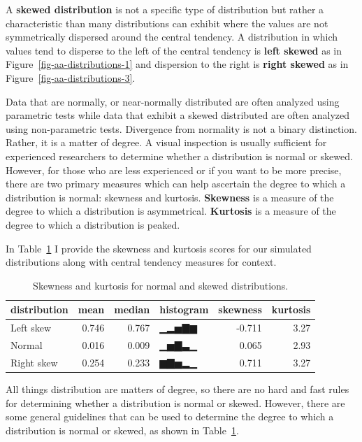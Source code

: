 \documentclass[
  letterpaper,
  DIV=11,
  numbers=noendperiod]{scrreport}
\theoremstyle{definition}
\theoremstyle{remark}
\begin{document}
A \textbf{skewed distribution} is not a specific type of distribution
but rather a characteristic than many distributions can exhibit where
the values are not symmetrically dispersed around the central tendency.
A distribution in which values tend to disperse to the left of the
central tendency is \textbf{left skewed} as in
Figure~\ref{fig-aa-distributions-1} and dispersion to the right is
\textbf{right skewed} as in Figure~\ref{fig-aa-distributions-3}.

Data that are normally, or near-normally distributed are often analyzed
using parametric tests while data that exhibit a skewed distributed are
often analyzed using non-parametric tests. Divergence from normality is
not a binary distinction. Rather, it is a matter of degree. A visual
inspection is usually sufficient for experienced researchers to
determine whether a distribution is normal or skewed. However, for those
who are less experienced or if you want to be more precise, there are
two primary measures which can help ascertain the degree to which a
distribution is normal: skewness and kurtosis. \textbf{Skewness} is a
measure of the degree to which a distribution is asymmetrical.
\textbf{Kurtosis} is a measure of the degree to which a distribution is
peaked.

In Table~\ref{tbl-aa-skewness-kurtosis} I provide the skewness and
kurtosis scores for our simulated distributions along with central
tendency measures for context.

\hypertarget{tbl-aa-skewness-kurtosis}{}
\begin{table}
\caption{\label{tbl-aa-skewness-kurtosis}Skewness and kurtosis for normal and skewed distributions. }\tabularnewline

\centering
\begin{tabular}{l|r|r|l|r|r}
\hline
distribution & mean & median & histogram & skewness & kurtosis\\
\hline
Left skew & 0.746 & 0.767 & ▁▂▅▇▆ & -0.711 & 3.27\\
\hline
Normal & 0.016 & 0.009 & ▁▅▇▃▁ & 0.065 & 2.93\\
\hline
Right skew & 0.254 & 0.233 & ▆▇▅▂▁ & 0.711 & 3.27\\
\hline
\end{tabular}
\end{table}

All things distribution are matters of degree, so there are no hard and
fast rules for determining whether a distribution is normal or skewed.
However, there are some general guidelines that can be used to determine
the degree to which a distribution is normal or skewed, as shown in
Table~\ref{tbl-aa-skewness-kurtosis}.
\end{document}
